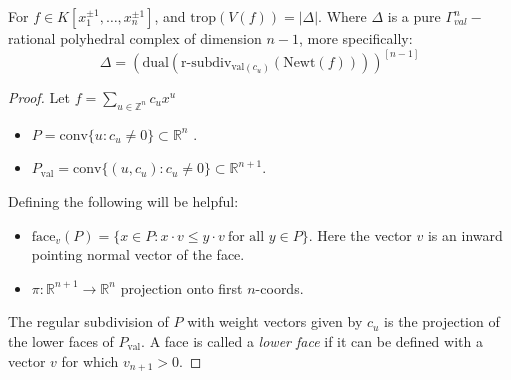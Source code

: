     \begin{theorem}
        For $f \in K[x_1^{\pm 1}, \dots, x_n^{\pm 1}]$, and $\text{trop}(V(f)) = |\Delta|$. Where $\Delta$ is a pure $\Gamma_{val}^n-$rational polyhedral complex of dimension $n-1$, more specifically:
        \begin{equation*}
            \Delta = \left(\text{dual}\left(\text{r-subdiv}_{\text{val}(c_u)}\left(\text{Newt}(f)\right)\right)\right)^{[n-1]}
        \end{equation*}
    \end{theorem}
    \begin{proof} 
       Let $f = \sum_{u \in \mathbb{Z}^n}c_ux^u$
       \begin{itemize}
           \item $P = \text{conv}\{u: c_u \neq 0\} \subset \mathbb{R}^n$ .
           \item $P_{\text{val}} = \text{conv}\{(u,c_u): c_u \neq 0\}\subset \mathbb{R}^{n+1}$.
       \end{itemize}
       Defining the following will be helpful:
       \begin{itemize}
           \item $\text{face}_v(P) = \{x \in P : x\cdot v \leq y \cdot v~ \text{for all } y \in P\}$. Here the vector $v$ is an inward pointing normal vector of the face.
           \item $\pi: \mathbb{R}^{n+1} \to \mathbb{R}^n$ projection onto first $n$-coords.
       \end{itemize}
       The regular subdivision of $P$ with weight vectors given by $c_u$ is the projection of the lower faces of $P_{\text{val}}$.
       A face is called a \textit{lower face} if it can be defined with a vector $v$ for which $v_{n+1} > 0$.
       

\end{proof}
